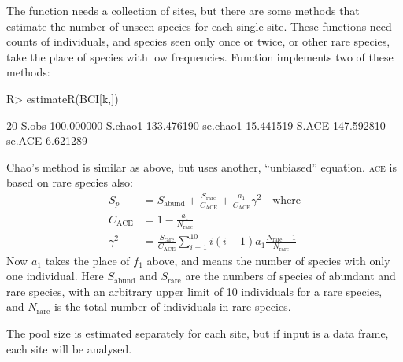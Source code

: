 \documentclass[article,nojss]{jss}
\begin{document}
The  function needs a collection of sites, but there
are some methods that estimate the number of unseen species for each
single site.  These functions need counts of individuals, and species
seen only once or twice, or other rare species, take the place of
species with low frequencies.  Function  implements
two of these methods:
\begin{Schunk}
\begin{Sinput}
R> estimateR(BCI[k,])
\end{Sinput}
\begin{Soutput}
                 20
S.obs    100.000000
S.chao1  133.476190
se.chao1  15.441519
S.ACE    147.592810
se.ACE     6.621289
\end{Soutput}
\end{Schunk}
Chao's method is similar as above, but uses another, ``unbiased''
equation. \textsc{ace} is based on rare species also:
\begin{equation}
\begin{split}
S_p &= S_\mathrm{abund} + \frac{S_\mathrm{rare}}{C_\mathrm{ACE}} +
\frac{a_1}{C_\mathrm{ACE}} \gamma^2 \quad \text{where}\\
C_\mathrm{ACE} &= 1 - \frac{a_1}{N_\mathrm{rare}}\\
\gamma^2 &= \frac{S_\mathrm{rare}}{C_\mathrm{ACE}} \sum_{i=1}^{10} i
(i-1) a_1 \frac{N_\mathrm{rare} - 1}{N_\mathrm{rare}}
\end{split}
\end{equation}
Now $a_1$ takes the place of $f_1$ above, and means the number of
species with only one individual.
Here $S_\mathrm{abund}$ and $S_\mathrm{rare}$ are the numbers of
species of abundant and rare species, with an arbitrary upper limit of
10 individuals for a rare species, and $N_\mathrm{rare}$ is the total
number of individuals in rare species.

The pool size
is estimated separately for each site, but if input is a data frame,
each site will be analysed.
\end{document}
